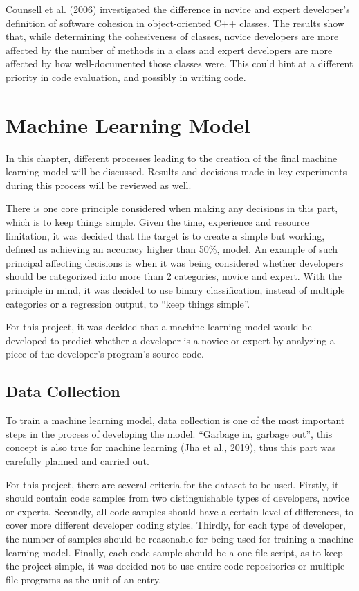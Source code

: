 \documentclass{report}
\begin{document}
Counsell et al. (2006) investigated the difference in novice and expert developer’s definition of software cohesion in object-oriented C++ classes. The results show that, while determining the cohesiveness of classes, novice developers are more affected by the number of methods in a class and expert developers are more affected by how well-documented those classes were. This could hint at a different priority in code evaluation, and possibly in writing code.

\chapter{Machine Learning Model}

In this chapter, different processes leading to the creation of the final machine learning model will be discussed. Results and decisions made in key experiments during this process will be reviewed as well.

There is one core principle considered when making any decisions in this part, which is to keep things simple. Given the time, experience and resource limitation, it was decided that the target is to create a simple but working, defined as achieving an accuracy higher than 50\%, model. An example of such principal affecting decisions is when it was being considered whether developers should be categorized into more than 2 categories, novice and expert. With the principle in mind, it was decided to use binary classification, instead of multiple categories or a regression output, to “keep things simple”.

For this project, it was decided that a machine learning model would be developed to predict whether a developer is a novice or expert by analyzing a piece of the developer’s program’s source code.

\section{Data Collection}

To train a machine learning model, data collection is one of the most important steps in the process of developing the model. “Garbage in, garbage out”, this concept is also true for machine learning (Jha et al., 2019), thus this part was carefully planned and carried out.

For this project, there are several criteria for the dataset to be used. Firstly, it should contain code samples from two distinguishable types of developers, novice or experts. Secondly, all code samples should have a certain level of differences, to cover more different developer coding styles. Thirdly, for each type of developer, the number of samples should be reasonable for being used for training a machine learning model. Finally, each code sample should be a one-file script, as to keep the project simple, it was decided not to use entire code repositories or multiple-file programs as the unit of an entry.
\end{document}
